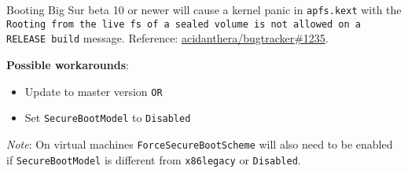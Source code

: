 \documentclass[]{article}
\providecommand{\tightlist}{%
  \setlength{\itemsep}{0pt}\setlength{\parskip}{0pt}}
\begin{document}
\begin{itemize}
  Booting Big Sur beta 10 or newer will cause a kernel panic in \texttt{apfs.kext} with the
  \texttt{Rooting from the live fs of a sealed volume is not allowed on a RELEASE build}
  message. Reference:
  \href{https://github.com/acidanthera/bugtracker/issues/1235}{acidanthera/bugtracker\#1235}.

  \textbf{Possible workarounds}:
  \begin{itemize}
    \tightlist

    \item Update to master version \texttt{OR}
    \item Set \texttt{SecureBootModel} to \texttt{Disabled}

  \end{itemize}

  \emph{Note}: On virtual machines \texttt{ForceSecureBootScheme} will also need
  to be enabled if \texttt{SecureBootModel} is different from \texttt{x86legacy}
  or \texttt{Disabled}.

\end{itemize}
\end{document}
